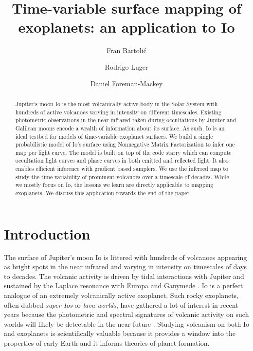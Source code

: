 \documentclass[modern]{aastex62}
\begin{document}
\title{Time-variable surface mapping of exoplanets: an application to Io}

\author{Fran Bartoli\'c}
\author{Rodrigo Luger}
\author{Daniel Foreman-Mackey}
%

\begin{abstract}
Jupiter's moon Io is the most volcanically active body in the Solar System with hundreds of active volcanoes varying in intensity on different timescales.
Existing photometric observations in the near infrared taken during occultations by Jupiter and Galilean moons encode a wealth of information about its surface.
As such, Io is an ideal testbed for models of time-variable exoplanet surfaces.
We build a single probabilistic model of Io's surface using Nonnegative Matrix Factorization to infer one map per light curve.
The model is built on top of the code starry \href{https://rodluger.github.io/starry/}{\color{linkcolor}\faGithub} which can compute occultation light curves and phase curves in both emitted and reflected light. It also enables efficient inference with gradient based samplers.
We use the inferred map to study the time variability of prominent volcanoes over a timescale of decades.
While we mostly focus on Io, the lessons we learn are directly applicable to mapping exoplanets.
We discuss this application towards the end of the paper.\href{https://github.com/fbartolic/volcano}{\color{linkcolor}\faGithub}

\end{abstract}

%
\section{Introduction}
The surface of Jupiter's moon Io is littered with hundreds of volcanoes appearing as bright spots in the near infrared and varying in intensity on timescales of days to decades.
The volcanic activity is driven by tidal interactions with Jupiter and sustained by the Laplace resonance with Europa and Ganymede \citep{peale_melting_1979}.
Io is a perfect analogue of an extremely volcanically active exoplanet.
Such rocky exoplanets, often dubbed \emph{super-Ios} or \emph{lava worlds}, have gathered a lot of interest in recent years because the photometric and spectral signatures of volcanic activity on such worlds will likely be detectable in the near future \citep{kaltenegger_detecting_2010,henning_highly_2018,oza_sodium_2019}.
Studying volcanism on both Io and exoplanets is scientifically valuable because it provides a window into the properties of early Earth and it informs theories of planet formation.
\end{document}

